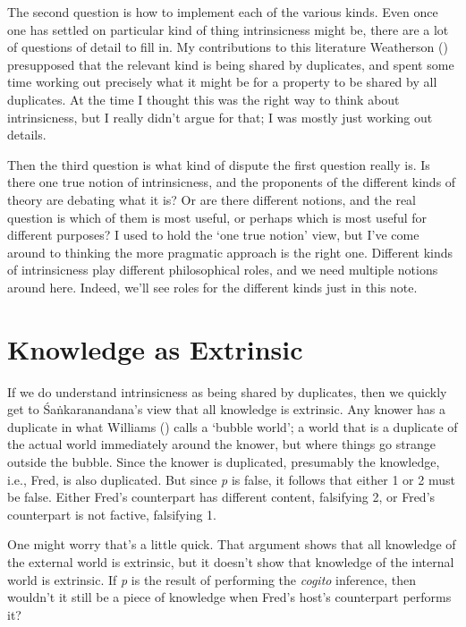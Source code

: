 \documentclass[
  10pt,
  letterpaper,
  DIV=11,
  numbers=noendperiod,
  twoside]{scrartcl}
\begin{document}
The second question is how to implement each of the various kinds. Even
once one has settled on particular kind of thing intrinsicness might be,
there are a lot of questions of detail to fill in. My contributions to
this literature Weatherson ()
presupposed that the relevant kind is being shared by duplicates, and
spent some time working out precisely what it might be for a property to
be shared by all duplicates. At the time I thought this was the right
way to think about intrinsicness, but I really didn't argue for that; I
was mostly just working out details.

Then the third question is what kind of dispute the first question
really is. Is there one true notion of intrinsicness, and the proponents
of the different kinds of theory are debating what it is? Or are there
different notions, and the real question is which of them is most
useful, or perhaps which is most useful for different purposes? I used
to hold the `one true notion' view, but I've come around to thinking the
more pragmatic approach is the right one. Different kinds of
intrinsicness play different philosophical roles, and we need multiple
notions around here. Indeed, we'll see roles for the different kinds
just in this note.

\section{Knowledge as Extrinsic}\label{knowledge-as-extrinsic}

If we do understand intrinsicness as being shared by duplicates, then we
quickly get to Śaṅkaranandana's view that all knowledge is extrinsic.
Any knower has a duplicate in what Williams
() calls a `bubble world'; a world that
is a duplicate of the actual world immediately around the knower, but
where things go strange outside the bubble. Since the knower is
duplicated, presumably the knowledge, i.e., Fred, is also duplicated.
But since \emph{p} is false, it follows that either 1 or 2 must be
false. Either Fred's counterpart has different content, falsifying 2, or
Fred's counterpart is not factive, falsifying 1.

One might worry that's a little quick. That argument shows that all
knowledge of the external world is extrinsic, but it doesn't show that
knowledge of the internal world is extrinsic. If \emph{p} is the result
of performing the \emph{cogito} inference, then wouldn't it still be a
piece of knowledge when Fred's host's counterpart performs it?
\end{document}
